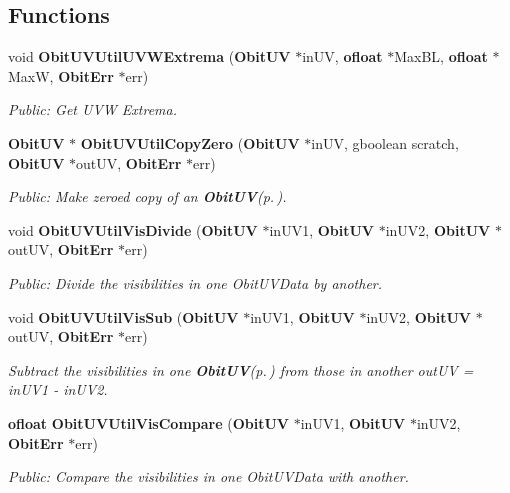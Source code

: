 \subsection*{Functions}
\begin{CompactItemize}
\item 
void {\bf Obit\-UVUtil\-UVWExtrema} ({\bf Obit\-UV} $\ast$in\-UV, {\bf ofloat} $\ast$Max\-BL, {\bf ofloat} $\ast$Max\-W, {\bf Obit\-Err} $\ast$err)
\begin{CompactList}\small\item\em Public: Get UVW Extrema. \item\end{CompactList}\item 
{\bf Obit\-UV} $\ast$ {\bf Obit\-UVUtil\-Copy\-Zero} ({\bf Obit\-UV} $\ast$in\-UV, gboolean scratch, {\bf Obit\-UV} $\ast$out\-UV, {\bf Obit\-Err} $\ast$err)
\begin{CompactList}\small\item\em Public: Make zeroed copy of an {\bf Obit\-UV}{\rm (p.\,\pageref{structObitUV})}. \item\end{CompactList}\item 
void {\bf Obit\-UVUtil\-Vis\-Divide} ({\bf Obit\-UV} $\ast$in\-UV1, {\bf Obit\-UV} $\ast$in\-UV2, {\bf Obit\-UV} $\ast$out\-UV, {\bf Obit\-Err} $\ast$err)
\begin{CompactList}\small\item\em Public: Divide the visibilities in one Obit\-UVData by another. \item\end{CompactList}\item 
void {\bf Obit\-UVUtil\-Vis\-Sub} ({\bf Obit\-UV} $\ast$in\-UV1, {\bf Obit\-UV} $\ast$in\-UV2, {\bf Obit\-UV} $\ast$out\-UV, {\bf Obit\-Err} $\ast$err)
\begin{CompactList}\small\item\em Subtract the visibilities in one {\bf Obit\-UV}{\rm (p.\,\pageref{structObitUV})} from those in another out\-UV = in\-UV1 - in\-UV2. \item\end{CompactList}\item 
{\bf ofloat} {\bf Obit\-UVUtil\-Vis\-Compare} ({\bf Obit\-UV} $\ast$in\-UV1, {\bf Obit\-UV} $\ast$in\-UV2, {\bf Obit\-Err} $\ast$err)
\begin{CompactList}\small\item\em Public: Compare the visibilities in one Obit\-UVData with another. \item\end{CompactList}\item 

\end{CompactItemize}
